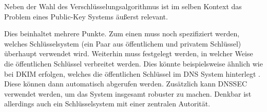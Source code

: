 Neben der Wahl des Verschlüsselungsalgorithmus ist im selben Kontext das Problem eines Public-Key Systems äußerst relevant.

Dies beinhaltet mehrere Punkte. Zum einen muss noch spezifiziert werden, welches Schlüsselsystem (ein Paar aus öffentlichem und privatem Schlüssel) überhaupt verwendet wird. Weiterhin muss festgelegt werden, in welcher Weise die öffentlichen Schlüssel verbreitet werden. Dies könnte beispielsweise ähnlich wie bei DKIM  erfolgen, welches die öffentlichen Schlüssel im DNS System hinterlegt . Diese können dann automatisch abgerufen werden. Zusätzlich kann DNSSEC  verwendet werden, um das System insgesamt robuster zu machen. Denkbar ist allerdings auch ein Schlüsselsystem mit einer zentralen Autorität.

